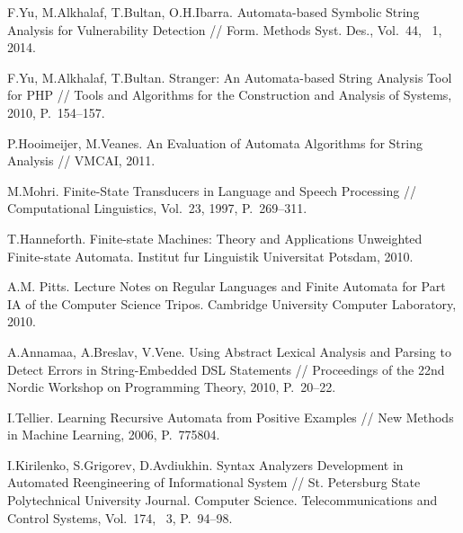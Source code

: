 \begin{thebibliography}{99}
 F.Yu, M.Alkhalaf, T.Bultan, O.H.Ibarra.
 Automata-based Symbolic String Analysis for Vulnerability Detection //
 Form. Methods Syst. Des., Vol.~44, \textnumero~1, 2014.

 F.Yu, M.Alkhalaf, T.Bultan.
 Stranger: An Automata-based String Analysis Tool for PHP //
 Tools and Algorithms for the Construction and Analysis of Systems, 2010,
 P.~154--157.

 P.Hooimeijer, M.Veanes.
 An Evaluation of Automata Algorithms for String Analysis //
 VMCAI, 2011.

 M.Mohri. Finite-State Transducers in Language and Speech Processing //
 Computational Linguistics, Vol.~23, 1997, P.~269--311.

  T.Hanneforth.
  Finite-state Machines: Theory and Applications Unweighted Finite-state Automata.
  Institut fur Linguistik Universitat Potsdam, 2010.

  A.M. Pitts. Lecture Notes on Regular Languages and Finite Automata for 
  Part IA of the Computer Science Tripos.
  Cambridge University Computer Laboratory, 2010.

  A.Annamaa, A.Breslav, V.Vene.
  Using Abstract Lexical Analysis and Parsing to Detect Errors in String-Embedded DSL Statements //
  Proceedings of the 22nd Nordic Workshop on Programming Theory, 2010, P.~20--22.

  I.Tellier. Learning Recursive Automata from Positive Examples //
  New Methods in Machine Learning, 2006,  P.~775804.

 I.Kirilenko, S.Grigorev, D.Avdiukhin.
 Syntax Analyzers Development in Automated Reengineering of Informational System //
 St. Petersburg State Polytechnical University Journal. Computer Science. Telecommunications and Control Systems,
 Vol.~174, \textnumero~3, P.~94--98.
\end{thebibliography}
